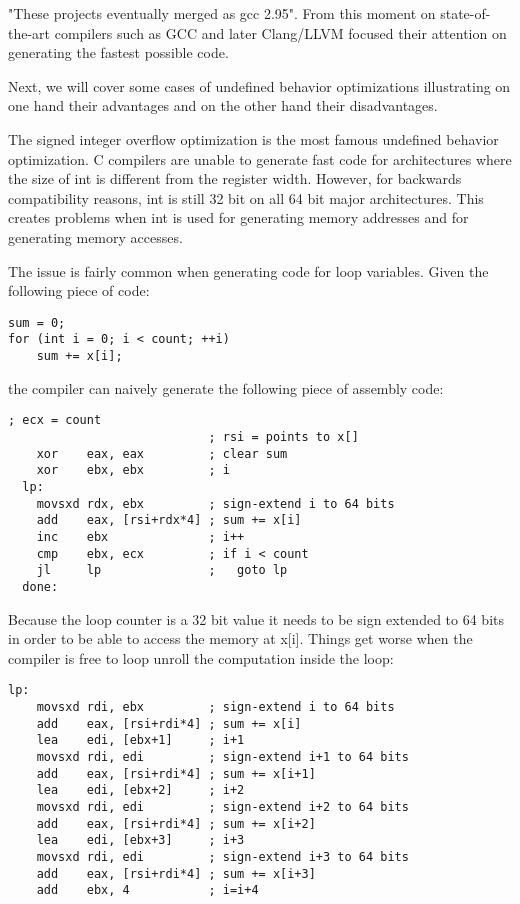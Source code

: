 "These projects eventually merged as gcc 2.95". From this moment on
state-of-the-art compilers such as GCC and later Clang/LLVM focused
their attention on generating the fastest possible code.

Next, we will cover some  cases of undefined
behavior optimizations illustrating on one hand their advantages and on
the other hand their disadvantages.

The signed integer overflow optimization is the most famous undefined
behavior optimization. C compilers are unable to generate fast code for
architectures where the size of int is different from the register
width. However, for backwards compatibility reasons, int is still 32 bit
on all 64 bit major architectures. This creates problems when int is
used for generating memory addresses and for generating memory accesses.

The issue is fairly common when generating code for loop variables.
Given the following piece of code:
\begin{lstlisting}[style=Cstyle, caption={}, label={}]
sum = 0;
for (int i = 0; i < count; ++i)
	sum += x[i];
\end{lstlisting}
the compiler can naively generate the following piece of assembly code:
\begin{lstlisting}[style=Cstyle, caption={}, label={}]
                            ; ecx = count
                            ; rsi = points to x[]
    xor    eax, eax         ; clear sum
    xor    ebx, ebx         ; i
  lp:
    movsxd rdx, ebx         ; sign-extend i to 64 bits
    add    eax, [rsi+rdx*4] ; sum += x[i]
    inc    ebx              ; i++
    cmp    ebx, ecx         ; if i < count
    jl     lp               ;   goto lp
  done:
\end{lstlisting}

Because the loop counter is a 32 bit value it needs to be sign extended
to 64 bits in order to be able to access the memory at x[i]. Things get
worse when the compiler is free to loop unroll the computation inside
the loop:
\begin{lstlisting}[style=Cstyle, caption={}, label={}]
  lp:
    movsxd rdi, ebx         ; sign-extend i to 64 bits
    add    eax, [rsi+rdi*4] ; sum += x[i]
    lea    edi, [ebx+1]     ; i+1
    movsxd rdi, edi         ; sign-extend i+1 to 64 bits
    add    eax, [rsi+rdi*4] ; sum += x[i+1]
    lea    edi, [ebx+2]     ; i+2
    movsxd rdi, edi         ; sign-extend i+2 to 64 bits
    add    eax, [rsi+rdi*4] ; sum += x[i+2]
    lea    edi, [ebx+3]     ; i+3
    movsxd rdi, edi         ; sign-extend i+3 to 64 bits
    add    eax, [rsi+rdi*4] ; sum += x[i+3]
    add    ebx, 4           ; i=i+4
\end{lstlisting}

